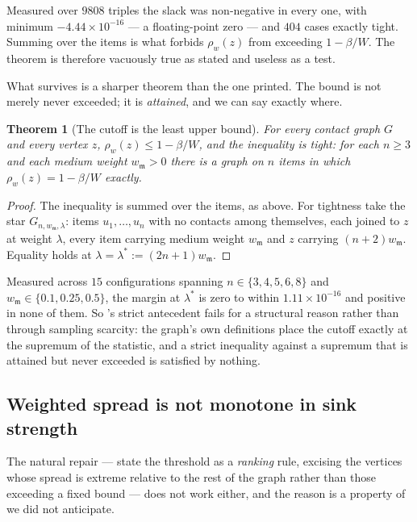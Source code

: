 \documentclass[11pt,a4paper]{article}
\newtheorem{theorem}{Theorem}[section]
\theoremstyle{definition}
\theoremstyle{remark}
\newcommand{\wt}{w}
\newcommand{\med}{\mathfrak{m}}
\newcommand{\flo}{\beta}
\newcommand{\spr}{\rho}                       %
\newcommand{\wm}{w_{\med}}                    %
\begin{document}
Measured over $9808$ triples the slack was non-negative in every one,
with minimum $-4.44\times 10^{-16}$ --- a floating-point zero --- and
$404$ cases exactly tight. Summing  over the
items is what forbids $\spr_{\wt}(z)$ from exceeding $1 - \flo/W$. The
theorem is therefore vacuously true as stated and useless as a test.

What survives is a sharper theorem than the one printed. The bound is
not merely never exceeded; it is \emph{attained}, and we can say exactly
where.

\begin{theorem}[The cutoff is the least upper bound]\label{thm:cutoff-tight}
For every contact graph $G$ and every vertex $z$,
$\spr_{\wt}(z) \le 1 - \flo/W$, and the inequality is tight: for each
$n \ge 3$ and each medium weight $\wm > 0$ there is a graph on $n$ items
in which $\spr_{\wt}(z) = 1 - \flo/W$ exactly.
\end{theorem}

\begin{proof}
The inequality is  summed over the items, as
above. For tightness take the star $G_{n,\wm,\lambda}$: items
$u_1,\dots,u_n$ with no contacts among themselves, each joined to $z$ at
weight $\lambda$, every item carrying medium weight $\wm$ and $z$
carrying $(n+2)\wm$. Equality holds at
$\lambda = \lambda^* := (2n+1)\wm$.
\end{proof}

Measured across $15$ configurations spanning
$n \in \{3,4,5,6,8\}$ and $\wm \in \{0.1, 0.25, 0.5\}$, the margin at
$\lambda^*$ is zero to within $1.11\times10^{-16}$ and positive in none
of them. So 's strict antecedent fails for a
structural reason rather than through sampling scarcity: the graph's own
definitions place the cutoff exactly at the supremum of the statistic,
and a strict inequality against a supremum that is attained but never
exceeded is satisfied by nothing.

\subsection{Weighted spread is not monotone in sink strength}
\label{sec:inversion}

The natural repair --- state the threshold as a \emph{ranking} rule,
excising the vertices whose spread is extreme relative to the rest of
the graph rather than those exceeding a fixed bound --- does not work
either, and the reason is a property of  we did not
anticipate.
\end{document}
